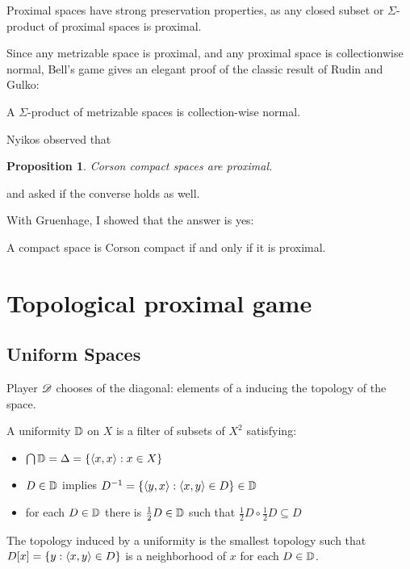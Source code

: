 \documentclass{beamer}
\newtheorem{proposition}[theorem]{Proposition}
\theoremstyle{definition}
\begin{document}
\begin{frame}
  Proximal spaces have strong preservation properties, as any
  closed subset or $\Sigma$-product of proximal spaces is proximal.

  \vpause

  Since any metrizable space is proximal, and
  any proximal space is collectionwise normal, Bell's game gives an elegant
  proof of the classic result of Rudin and Gulko:

  \begin{theorem}
    A $\Sigma$-product of metrizable spaces is collection-wise normal.
  \end{theorem}
\end{frame}

\begin{frame}
  Nyikos \cite{MR3288115} observed that
  \begin{proposition}
    Corson compact spaces are proximal.
  \end{proposition}
  and asked if the converse holds as well.

  \vpause

  With Gruenhage, I showed that the answer is yes: \cite{MR3227201}
  \begin{theorem}
    A compact space is Corson compact if and only if it is proximal.
  \end{theorem}
\end{frame}


\section{Topological proximal game}

\subsection{Uniform Spaces}

\begin{frame}
  Player $\mathscr{D}$ chooses  of the diagonal: elements of
  a  inducing the topology of the space.

  \vpause

  A uniformity $\mathbb{D}$ on $X$ is a filter of subsets of $X^2$
  satisfying:
  \begin{itemize}
    \item $\bigcap \mathbb{D} = \Delta=\{\langle x,x\rangle:x\in X\}$
    \item $D\in\mathbb{D}$ implies $D^{-1}=\{\langle y,x\rangle:\langle x,y\rangle\in D\}\in\mathbb{D}$
    \item for each $D\in\mathbb{D}$ there is $\frac{1}{2}D\in\mathbb{D}$ such that
          $\frac{1}{2}D\circ\frac{1}{2}D\subseteq D$
  \end{itemize}

  \vpause

  The topology induced by a uniformity is the smallest topology such that
  $D[x]=\{y:\langle x,y\rangle\in D\}$ is a neighborhood of $x$ for each $D\in\mathbb{D}$.
\end{frame}
\end{document}
